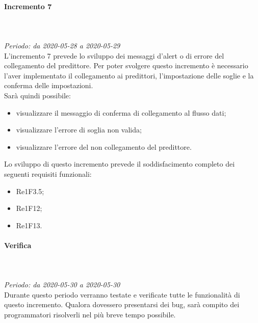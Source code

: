\paragraph{Incremento 7}\mbox{} \\ \mbox{} \\ 
\textit{Periodo: da 2020-05-28 a 2020-05-29}\\
L’incremento 7 prevede lo sviluppo dei messaggi d'alert o di errore del collegamento del predittore. Per poter svolgere questo incremento è necessario l'aver implementato il collegamento ai predittori, l'impostazione delle soglie e la conferma delle impostazioni. \\
Sarà quindi possibile:
\begin{itemize}
	\item visualizzare il messaggio di conferma di collegamento al flusso dati;
	\item visualizzare l'errore di soglia non valida;
	\item visualizzare l'errore del non collegamento del predittore.
\end{itemize}
Lo sviluppo di questo incremento prevede il soddisfacimento completo dei seguenti requisiti funzionali:
\begin{itemize}
\item Re1F3.5;
\item Re1F12;
\item Re1F13.
\end{itemize}
\paragraph*{Verifica}\mbox{} \\ \mbox{} \\ 
\textit{Periodo: da 2020-05-30 a 2020-05-30}\\
Durante questo periodo verranno testate e verificate tutte le funzionalità di questo incremento. Qualora dovessero presentarsi dei bug, sarà compito dei programmatori risolverli nel più breve tempo possibile.

